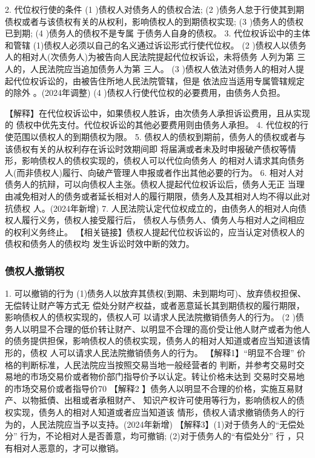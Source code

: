 \documentclass[UTF8,12pt]{ctexart}
\numberwithin{equation}{section} %
\numberwithin{figure}{section}
\numberwithin{table}{section}
\begin{document}
	2. 代位权行使的条件
	(1 )债权人对债务人的债权合法;
	(2 )债务人怠于行使其到期债权或者与该债权有关的从权利，影响债权人的到期债权实现; (3 )债务人的债权已到期;
	(4 )债务人的债权不是专属 于债务人自身的债权。
	3. 代位权诉讼中的主体和管辖
	(1)债权人必须以自己的名义通过诉讼形式行使代位权。
	(2 )债权人以债务人的相对人(次债务人)为被告向人民法院提起代位权诉讼，未将债务 人列为第 三人的，人民法院应当追加债务人为第 三人。
	(3 )债权人依法对债务人的相对人提起代位权诉讼的，由被告住所地人民法院管辖，但是 依法应当适用专属管辖规定的除外 。(2024年调整)
	(4 )债权人行使代位权的必要费用，由债务人负担。
	
	
	【解释】在代位权诉讼中，如果债权人胜诉，由次债务人承担诉讼费用，且从实现的 债权中优先支付。代位权诉讼的其他必要费用则由债务人承担。
	4. 代位权的行使范围以债权人的到期债权为限。
	5. 债权人的债权到期前，债务人的债权或者与该债权有关的从权利存在诉讼时效期间即 将届满或者未及时申报破产债权等情形，影响债权人的债权实现的，债权人可以代位向债务人 的相对人请求其向债务人(而非债权人)履行、向破产管理人申报或者作出其他必要的行为。 6. 相对人对债务人的抗辩，可以向债权人主张。债权人提起代位权诉讼后，债务人无正 当理由减免相对人的债务或者延长相对人的履行期限，债务人及其相对人均不得以此对抗债权 人。(2024年新增)
	7. 人民法院认定代位权成立的，由债务人的相对人向债权人履行义务，债权人接受履行后， 债权人与债务人、債务人与相对人之间相应的权利义务终止。
	【相关链接】债权人提起代位权诉讼的，应当认定对债权人的债权和债务人的债权均 发生诉讼时效中断的效力。
	
	\subsubsection{债权人撤销权}
	1. 可以撤销的行为 (1)债务人以放弃其债权(到期、未到期均可)、放弃债权担保、无偿转让财产等方式无 偿处分财产权益，或者恶意延长其到期债权的履行期限，影响债权人的债权实现的，债权人可 以请求人民法院撤销债务人的行为。
	(2 )债务人以明显不合理的低价转让财产、以明显不合理的高价受让他人财产或者为他人 的债务提供担保，影响债权人的债权实现，债务人的相对人知道或者应当知道该情形的，债权 人可以请求人民法院撤销债务人的行为。
	【解释1】“明显不合理” 价格的判断标准，人民法院应当按照交易当地一般经营者的 判断，并参考交易时交易地的市场交易价或者物价部门指导价予以认定。转让价格未达到 交易时交易地的市场交易价或者指导价70%
	【解释2 】债务人以明显不合理的价格，实施互易财产、以物抵債、出租或者承租财产、 知识产权许可使用等行为，影响债权人的债权实现，债务人的相对人知道或者应当知道该 情形，债权人请求撤销债务人的行为的，人民法院应当予以支持。(2024年新增) 【解释3】(1)对于债务人的“无偿处分” 行为，不论相对人是否善意，均可撤销; (2)对于债务人的“有偿处分” 行 ，只有相对人恶意的，才可以撤销。
	
\end{document}
